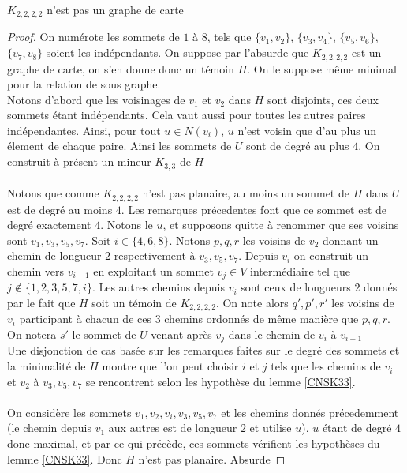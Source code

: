 \documentclass{scrartcl}
\begin{document}
\begin{flushleft}
\begin{prop}\label{K2222}
    $K_{2,2,2,2}$ n'est pas un graphe de carte
\end{prop}

\begin{proof}
    On numérote les sommets de $1$ à $8$, tels que $\{v_1,v_2\}$, $\{v_3,v_4\}$, $\{v_5,v_6\}$, $\{v_7,v_8\}$ soient les indépendants.
    On suppose par l'absurde que $K_{2,2,2,2}$ est un graphe de carte, on s'en donne donc un témoin $H$. On le suppose même minimal pour
    la relation de sous graphe.\\
    Notons d'abord que les voisinages de $v_1$ et $v_2$ dans $H$ sont disjoints, ces deux sommets étant indépendants. Cela vaut
    aussi pour toutes les autres paires indépendantes. Ainsi, pour tout $u \in N(v_i)$, $u$ n'est voisin que d'au plus un élement de
    chaque paire. Ainsi les sommets de $U$ sont de degré au plus $4$. On construit à présent un mineur $K_{3,3}$ de $H$
    \\~\\
    Notons que comme $K_{2,2,2,2}$ n'est pas planaire, au moins un sommet de $H$ dans $U$ est de degré au moins $4$. Les remarques
    précedentes font que ce sommet est de degré exactement $4$. Notons le $u$, et supposons quitte à renommer que ses voisins
    sont $v_1, v_3, v_5, v_7$. Soit $i \in \{4, 6, 8\}$. Notons $p, q, r$ les voisins de $v_2$ donnant un chemin de longueur
    $2$ respectivement à $v_3, v_5, v_7$. Depuis $v_i$ on construit un chemin vers $v_{i-1}$ en exploitant un sommet $v_j \in V$ intermédiaire
    tel que $j \notin \{1, 2, 3, 5, 7, i\}$. Les autres chemins depuis $v_i$ sont ceux de longueurs $2$ donnés par le fait que $H$ soit
    un témoin de $K_{2,2,2,2}$. On note alors $q', p', r'$ les voisins de $v_i$ participant à chacun de ces $3$ chemins
    ordonnés de même manière que $p, q, r$. On notera $s'$ le sommet de $U$ venant après $v_j$ dans le chemin de $v_i$ à $v_{i-1}$\\
    Une disjonction de cas basée sur les remarques faites sur le degré des sommets et la minimalité de $H$ montre
    que l'on peut choisir $i$ et $j$ tels que les chemins de $v_i$ et $v_2$ à $v_3, v_5, v_7$ se rencontrent selon
    les hypothèse du lemme \ref{CNSK33}.
    \\~\\
    On considère les sommets $v_1, v_2, v_i, v_3, v_5, v_7$ et les chemins donnés précedemment (le chemin depuis $v_1$ aux autres est de longueur
    $2$ et utilise $u$). $u$ étant de degré $4$ donc maximal, et par ce qui précède, ces sommets vérifient les hypothèses du lemme
    \ref{CNSK33}. Donc $H$ n'est pas planaire. Absurde
\end{proof}


\end{flushleft}
\end{document}
